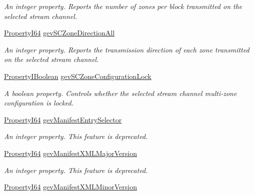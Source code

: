 \begin{DoxyCompactItemize}
\begin{DoxyCompactList}\small\item\em An integer property. Reports the number of zones per block transmitted on the selected stream channel. \end{DoxyCompactList}\item 
\hyperlink{group___common_interface_ga81749b2696755513663492664a18a893}{Property\+I64} \hyperlink{classmv_i_m_p_a_c_t_1_1acquire_1_1_gen_i_cam_1_1_transport_layer_control_ac73ebd07e6fa8eba10423619dcb729ed}{gev\+S\+C\+Zone\+Direction\+All}
\begin{DoxyCompactList}\small\item\em An integer property. Reports the transmission direction of each zone transmitted on the selected stream channel. \end{DoxyCompactList}\item 
\hyperlink{group___common_interface_ga44f9437e24b21b6c93da9039ec6786aa}{Property\+I\+Boolean} \hyperlink{classmv_i_m_p_a_c_t_1_1acquire_1_1_gen_i_cam_1_1_transport_layer_control_a8e8e110de119568d89b0883b8fb1c4b7}{gev\+S\+C\+Zone\+Configuration\+Lock}
\begin{DoxyCompactList}\small\item\em A boolean property. Controls whether the selected stream channel multi-\/zone configuration is locked. \end{DoxyCompactList}\item 
\hyperlink{group___common_interface_ga81749b2696755513663492664a18a893}{Property\+I64} \hyperlink{classmv_i_m_p_a_c_t_1_1acquire_1_1_gen_i_cam_1_1_transport_layer_control_af40efcdfbee79275cce94c1c4d8afae7}{gev\+Manifest\+Entry\+Selector}
\begin{DoxyCompactList}\small\item\em An integer property. This feature is deprecated. \end{DoxyCompactList}\item 
\hyperlink{group___common_interface_ga81749b2696755513663492664a18a893}{Property\+I64} \hyperlink{classmv_i_m_p_a_c_t_1_1acquire_1_1_gen_i_cam_1_1_transport_layer_control_aa076814262e6646b5a7178cd36454f50}{gev\+Manifest\+X\+M\+L\+Major\+Version}
\begin{DoxyCompactList}\small\item\em An integer property. This feature is deprecated. \end{DoxyCompactList}\item 
\hyperlink{group___common_interface_ga81749b2696755513663492664a18a893}{Property\+I64} \hyperlink{classmv_i_m_p_a_c_t_1_1acquire_1_1_gen_i_cam_1_1_transport_layer_control_a3b3747f9635ba2c4cbb432273209b092}{gev\+Manifest\+X\+M\+L\+Minor\+Version}

\end{DoxyCompactItemize}
